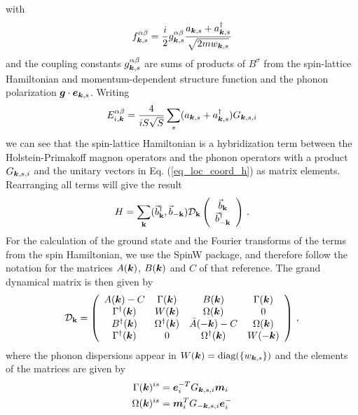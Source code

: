 \documentclass[aps,prl,twocolumn,superscriptaddress,amsmath,amssymb,floats,aps,10pt]{revtex4-1}
\begin{document}
with
\begin{equation}
 f_{\bm k,s}^{\alpha \beta} =\frac i2 g_{\bm k,s}^{\alpha \beta}\frac{a_{\bm k,s}+a_{\bm k,s}^\dagger}{\sqrt{2mw_{\bm k,s}}}
\end{equation}
and the coupling constants $g_{\bm k,s}^{\alpha \beta}$ are sums of products of $B^\sigma$ from the spin-lattice Hamiltonian and momentum-dependent structure 
function and the phonon polarization $\bm g\cdot \bm e_{\bm k,s}$.
Writing
\begin{equation}
 E_{i,\bm k}^{\alpha\beta}=\frac{4}{iS\sqrt S}\sum_s(a_{\bm k,s}+a_{\bm k,s}^\dagger)G_{\bm k,s,i}
\end{equation}
we can see that the spin-lattice Hamiltonian is a hybridization term between the Holstein-Primakoff magnon operators and the phonon
operators with a product $G_{\bm k,s,i}$ and the unitary vectors in Eq. (\ref{eq_loc_coord_h}) as matrix elements.
Rearranging all terms will give the result
\begin{equation}
H= \sum_{\bf k}(\vec b_{\bf k}^\dagger,\vec b_{-\bf k})\mathcal D_{\bf k}\left(\begin{array}{c}
                                                                               \vec b_{\bf k}\\
                                                                               \vec b_{\bf -k}^\dagger
                                                                              \end{array}\right) \label{eq_Htot}\,.
\end{equation}
For the calculation of the ground state and the Fourier transforms of the terms from the spin Hamiltonian, we use the SpinW\cite{Toth15} package, and therefore
follow the notation for the matrices $A(\bm k)$, $B(\bm k)$ and $C$ of that reference.
The grand dynamical matrix is then given by
\begin{equation}
 \mathcal D_{\bf k}=\left(
 \begin{array}{cccc}
  A(\bm k)-C & \Gamma(\bm k) & B(\bm k) &\Gamma(\bm k)\\
  \Gamma^\dagger(\bm k) & W(\bm k) & \Omega(\bm k)&0\\
  B^\dagger(\bm k)& \Omega^\dagger(\bm k) &\bar A(-\bm k)-C &\Omega(\bm k)\\
  \Gamma^\dagger(\bm k) &0&\Omega^\dagger(\bm k) &W(-\bm k)
 \end{array}\right)\,,
\end{equation}
where the phonon dispersions appear in $W(\bm k)=\text{diag}(\{w_{\bm k,s}\})$ and the elements of the matrices are given by
\begin{subequations}
 \begin{align}
 \Gamma(\bm k)^{is}&=\bm e_i^{-T}G_{\bm k,s,i}\bm m_i\\
 \Omega(\bm k)^{is}&=\bm m_i^TG_{-\bm k,s,i}\bm e_i^{-}
 \end{align}
\end{subequations}
\end{document}
